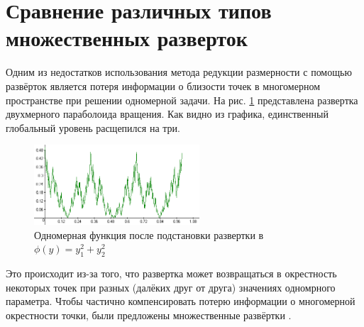 \section{Сравнение различных типов множественных разверток}
  Одним из недостатков использования метода редукции размерности с помощью развёрток является потеря информации о близости точек в многомерном пространстве при
  решении одномерной задачи. На рис. \ref{fig:paraboloid} представлена развертка двухмерного параболоида вращения. Как видно из графика, единственный глобальный уровень расщепился на три.
  \begin{figure}[h]
  	\center
    \includegraphics[width=0.55\textwidth]{map_paraboloid.png}
    \caption{Одномерная функция после подстановки развертки в \(\phi(y)=y_1^2+y_2^2\)}
    \label{fig:paraboloid}
  \end{figure}
   Это происходит из-за того, что развертка может возвращаться в окрестность некоторых точек при разных (далёких друг от друга) значениях одномрного параметра.
   Чтобы частично компенсировать потерю информации о многомерной окрестности точки, были предложены множественные развёртки \cite{}.
